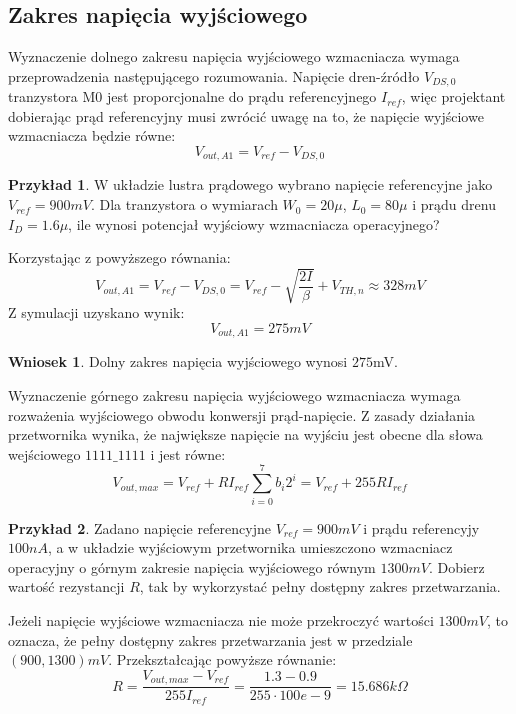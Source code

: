 \documentclass[10pt,a4paper,twoside]{report}
\theoremstyle{definition}
\theoremstyle{definition}
\theoremstyle{definition}
\newtheorem{przyklad}{Przykład}[section]
\theoremstyle{definition}
\theoremstyle{definition}
\newtheorem{wniosek}{Wniosek}[section]
\begin{document}
{{{{{{	\subsection{Zakres napięcia wyjściowego}
	{	Wyznaczenie dolnego zakresu napięcia wyjściowego wzmacniacza wymaga przeprowadzenia następującego rozumowania. Napięcie dren-źródło $V_{DS,0}$ tranzystora M0 jest proporcjonalne do prądu referencyjnego $I_{ref}$, więc projektant dobierając prąd referencyjny musi zwrócić uwagę na to, że napięcie wyjściowe wzmacniacza będzie równe:
		\begin{equation}
			V_{out,A1} = V_{ref} - V_{DS,0}
		\end{equation} 
	\begin{przyklad}{W układzie lustra prądowego wybrano napięcie referencyjne jako $V_{ref} = 900mV$. Dla tranzystora o wymiarach $W_0=20\mu$, $L_0=80\mu$ i prądu drenu $I_{D}=1.6\mu$, ile wynosi potencjał wyjściowy wzmacniacza operacyjnego?}
		
	{Korzystając z powyższego równania:
		\begin{equation}
			V_{out,A1} = V_{ref} - V_{DS,0} = V_{ref} - \sqrt{\frac{2I}{\beta}} +V_{TH,n} \approx 328 mV
		\end{equation}
	Z symulacji uzyskano wynik:
		\begin{equation}
			V_{out,A1} = 275mV
		\end{equation}
	}
	\end{przyklad}
	\begin{wniosek}{Dolny zakres napięcia wyjściowego wynosi $275$mV.}
	\end{wniosek}
	
	{	Wyznaczenie górnego zakresu napięcia wyjściowego wzmacniacza wymaga rozważenia wyjściowego obwodu konwersji prąd-napięcie. Z zasady działania przetwornika wynika, że największe napięcie na wyjściu jest obecne dla słowa wejściowego $1111\_1111$ i jest równe:
	\begin{equation}
		V_{out,max} = V_{ref} + R I_{ref} \sum_{i=0}^{7} b_i2^i = V_{ref} + 255 R I_{ref} 
	\end{equation}
	\begin{przyklad}{Zadano napięcie referencyjne $V_{ref}=900mV$ i prądu referencyjy $100nA$, a w układzie wyjściowym przetwornika umieszczono wzmacniacz operacyjny o górnym zakresie napięcia wyjściowego równym $1300mV$. Dobierz wartość rezystancji $R$, tak by wykorzystać pełny dostępny zakres przetwarzania.}
		
	{ Jeżeli napięcie wyjściowe wzmacniacza nie może przekroczyć wartości $1300mV$, to oznacza, że pełny dostępny zakres przetwarzania jest w przedziale $(900,1300)mV$. Przekształcając powyższe równanie:
	\begin{equation}
		R = \frac{V_{out,max} -  V_{ref}}{255  I_{ref} } = \frac{1.3-0.9}{255 \cdot 100e-9} = 15.686k\Omega
	\end{equation}	
	}
	\end{przyklad}}

}}}}}}}
\end{document}
